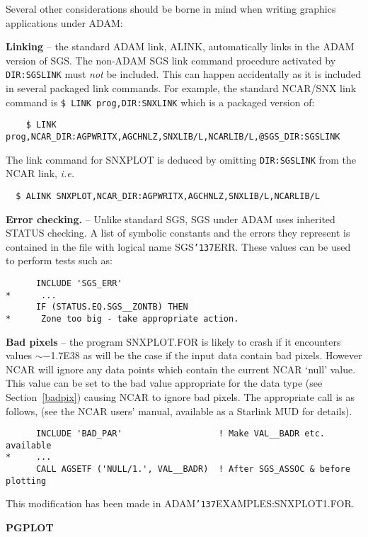 \documentclass[twoside,11pt]{article}
\renewcommand{\_}{{\tt\char'137}}
\begin{document}
Several other considerations should be borne in mind when writing graphics 
applications under ADAM:

{\bf Linking} -- the standard ADAM link, ALINK, 
automatically links in the ADAM version of SGS.
The non-ADAM SGS link command procedure activated by {\tt \@SGS\_DIR:SGSLINK} 
must {\sl not\/} be included.
This can happen accidentally as it is  included in several 
packaged link commands.
For example, the standard NCAR/SNX link command is
{\tt  \$ LINK prog,\@NCAR\_DIR:SNXLINK}
which is a packaged version of:
\begin{verbatim}
    $ LINK prog,NCAR_DIR:AGPWRITX,AGCHNLZ,SNXLIB/L,NCARLIB/L,@SGS_DIR:SGSLINK
\end{verbatim}
\newpage
The link command for SNXPLOT is deduced by
omitting {\tt \@SGS\_DIR:SGSLINK} from the NCAR link, {\it i.e.}
\begin{verbatim}
  $ ALINK SNXPLOT,NCAR_DIR:AGPWRITX,AGCHNLZ,SNXLIB/L,NCARLIB/L
\end{verbatim}
{\bf Error checking.} -- Unlike standard SGS, SGS under ADAM 
uses inherited STATUS checking.
A list of symbolic constants and the errors they represent is contained in 
the file with logical name SGS\_ERR.
These values can be used to perform tests such as:
\begin{verbatim}
      INCLUDE 'SGS_ERR'
*      ...
      IF (STATUS.EQ.SGS__ZONTB) THEN
*      Zone too big - take appropriate action.
\end{verbatim}
{\bf Bad pixels} -- the program SNXPLOT.FOR is likely to 
crash if it encounters values $\sim-$1.7E38
as will be the case if the input data contain bad pixels.
However NCAR will ignore any data points which contain the current 
NCAR `null' value.
This value can be set to the bad value appropriate for the data type
(see Section~\ref{badpix}) causing NCAR to ignore bad pixels.
The appropriate call is as follows, (see the NCAR users' manual, 
available as a Starlink MUD for details).
\begin{verbatim}
      INCLUDE 'BAD_PAR'                   ! Make VAL__BADR etc. available
*     ...                             
      CALL AGSETF ('NULL/1.', VAL__BADR)  ! After SGS_ASSOC & before plotting 
\end{verbatim}
This modification has been made in ADAM\_EXAMPLES:SNXPLOT1.FOR.


{\bigskip\large\bf PGPLOT}
\end{document}
